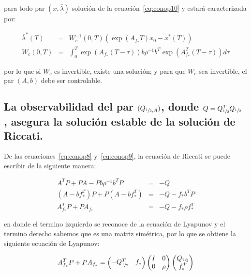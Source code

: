            para todo par $(x, \bar{\lambda})$ solución de la ecuación~\ref{eq:conop10} y estará caracterizada por:

            \begin{eqnarray*}
                \bar{\lambda}^*(T) & = & W_c^{-1}(0, T) \left( \exp{(A_{f_*} T)} x_0 - x^*(T) \right) \\
                W_c (0, T) & = & \int_0^T \exp{\left( A_{f_*}(T-\tau) \right)} b \rho^{-1} b^T \exp{\left( A_{f_*}^T(T-\tau) \right)} d\tau
            \end{eqnarray*}

            por lo que si $W_c$ es invertible, existe una solución; y para que $W_c$ sea invertible, el par $(A, b)$ debe ser controlable.


        \subsection{La observabilidad del par $(Q_{\sfrac{1}{2} ,A})$, donde $Q = Q_{\sfrac{1}{2}}^T Q_{\sfrac{1}{2}}$ , asegura la solución estable de la solución de Riccati.}

        De las ecuaciones~\ref{eq:conop8} y~\ref{eq:conop9}, la ecuación de Riccati se puede escribir de la siguiente manera:

        \begin{eqnarray*}
            A^T P + P A - P b \rho^{-1} b^T P & = & -Q \\
            (A - b f_{*}^T) P + P (A - b f_{*}^T) & = & -Q - f_{*} b^T P \\
            A_{f_*}^T P + P A_{f_*} & = & -Q - f_* \rho f_*^T
        \end{eqnarray*}

        en donde el termino izquierdo se reconoce de la ecuación de Lyapunov y el termino derecho sabemos que es una matriz simétrica, por lo que se obtiene la siguiente ecuación de Lyapunov:

        \begin{equation} \label{eq:conop11}
            A_{f_*}^T P + P A_{f_*} =
            \begin{pmatrix}
                -Q_{\sfrac{1}{2}}^T & f_*
            \end{pmatrix}
            \begin{pmatrix}
                I & 0 \\
                0 & \rho
            \end{pmatrix}
            \begin{pmatrix}
                Q_{\sfrac{1}{2}} \\
                f_*^T
            \end{pmatrix}
        \end{equation}

